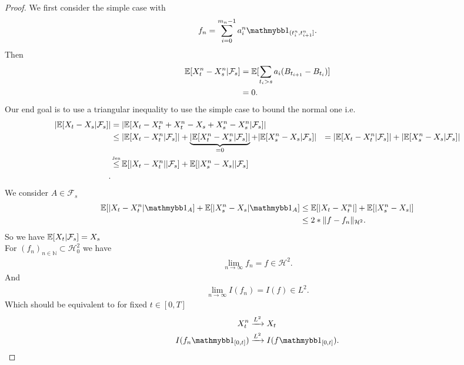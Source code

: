 \begin{proof}
 We first consider the simple case with 
 \begin{align*}
   f_n = \sum_{i=0}^{m_n - 1} a_i^{n}  \cha_{(t_i^{n},t_{i+1}^{n}  ]}
 .\end{align*}
 Then 
 \begin{align*}
   \mathbb{E}[X_{t}^{n} - X_{s}^{n} | \mathcal{F}_s  ] &= \mathbb{E}[\sum_{t_i > s} a_i(B_{t_{i+1}}-B_{t_i})]\\
                                               &=  0
 .\end{align*}
Our end goal is to use a triangular inequality to use the simple case to bound the normal one i.e.
\begin{align*}
  \abs{\E[X_t-X_s|\mathcal{F}_s]} &= \abs{\E[X_t-X_{t}^{n}+X_{t}^{n} -X_s +X_{s}^{n} -X_{s}^{n}  |\mathcal{F}_s]}\\
                                  &\le \abs{\E[X_t-X_{t}^{n}|\mathcal{F}_s]} + \underbrace{\abs{\E[X_{t}^{n} -X_{s}^{n}  |\mathcal{F}_s]}}_{=0} + \abs{\E[X_{s}^{n}-X_s|\mathcal{F}_s ]}
                                  &= \abs{\E[X_t-X_{t}^{n}|\mathcal{F}_s]} + \abs{\E[X_{s}^{n}-X_s|\mathcal{F}_s ]}\\
                                  &\myS{Jen}{\le } \E[\abs{X_t-X_{t}^{n}}|\mathcal{F}_s] + \E[\abs{X_{s}^{n}-X_s}|\mathcal{F}_s ]\\
.\end{align*}
We consider $A \in  \mathcal{F}_s$
\begin{align*}
  \E[\abs{X_t-X_{t}^{n}}\cha_A] + \E[\abs{X_{s}^{n}-X_s}\cha_A ] &\le \E[\abs{X_t-X_{t}^{n}}] + \E[\abs{X_{s}^{n}-X_s} ]\\
                                                                 &\le 2*\|f-f_n\|_{\mathcal{H}^2}
.\end{align*}
So we have $\mathbb{E}[X_t |\mathcal{F}_s] = X_s$\\[1ex]
For $(f_n)_{n \in  \mathbb{N}} \subset \mathcal{H}^2_0 $ we have 
\begin{align*}
  \lim_{n\to \infty}f_n = f \in \mathcal{H}^2
.\end{align*}
And 
\begin{align*}
  \lim_{n \to \infty} I(f_n) = I(f) \in L^2
.\end{align*}
Which should be equivalent to for fixed $t \in  [0,T]$
\begin{align*}
  X_t^n &\xrightarrow{L^2}  X_t \\
  I(f_n\cha_{[0,t]}) &\xrightarrow{L^2} I(f\cha_{[0,t]})
.\end{align*}

\end{proof}
